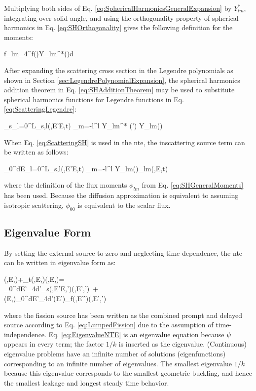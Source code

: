 Multiplying both sides of Eq. \eqref{eq:SphericalHarmonicsGeneralExpansion} by \(Y_{lm}^*\), integrating over solid angle, and using the orthogonality property of spherical harmonics in Eq. \eqref{eq:SHOrthogonality} gives the following definition for the moments:

\beq
\label{eq:SHGeneralMoments}
f_{lm}\equiv\int_{4\pi}^{}f(\hO)Y_{lm}^{*}(\hO)d\hO  
\eeq

After expanding the scattering cross section in the Legendre polynomials as shown in Section \ref{sec:LegendrePolynomialExpansion}, the spherical harmonics addition theorem in Eq. \eqref{eq:SHAdditionTheorem} may be used to substitute spherical harmonics functions for Legendre functions in Eq. \eqref{eq:ScatteringLegendre}:

\beq
\label{eq:ScatteringSH}
\Sigma_s\seatout \equiv\sum_{l=0}^L\Sigma_{s,l}(,E'\rightarrow E,t) \sum_{m=-l}^{l} Y_{lm}^{*} (\hO  ') Y_{lm}(\hO  )
\eeq

When Eq. \eqref{eq:ScatteringSH} is used in the \gls{nte}, the inscattering source term can be written as follows:

\beq
\label{eq:SHInscattering}
\int_0^\infty dE\sum_{l=0}^L\Sigma_{s,l}(,E'\rightarrow E,t) \sum_{m=-l}^{l}  Y_{lm}(\hO  )\phi_{lm}(,E,t)
\eeq

 where the definition of the flux moments \(\phi_{lm}\) from Eq. \eqref{eq:SHGeneralMoments} has been used. Because the diffusion approximation is equivalent to assuming isotropic scattering, \(\phi_{00}\) is equivalent to the scalar flux.
 
\subsection{Eigenvalue Form}
\label{sec:EigenvalueForm}
By setting the external source to zero and neglecting time dependence, the \gls{nte} can be written in eigenvalue form as:

\beqa
\label{eq:EigenvalueNTE}
\hO\cdot\nabla\psi(,E,\hO)+\Sigma_t(,E,\hO)\psi(,E,\hO)=\hspace{2cm}\\
\int_0^\infty dE'\int_{4\pi}d\hO'\Sigma_s(,E'\rightarrow E,\hO'\rightarrow\hO)\psi(,E',\hO')\ +\hspace{1cm}\\
\chi(E,\hO)\int_0^\infty dE'\int_{4\pi}d\hO'\nu(E')\Sigma_f(,E'\hO')\psi(,E',\hO')
\eeqa

where the fission source has been written as the combined prompt and delayed source according to Eq. \eqref{eq:LumpedFission} due to the assumption of time-independence. Eq. \eqref{eq:EigenvalueNTE} is an eigenvalue equation because \(\psi\) appears in every term; the factor \(1/k\) is inserted as the eigenvalue. (Continuous) eigenvalue problems have an infinite number of solutions (eigenfunctions) corresponding to an infinite number of eigenvalues. The smallest eigenvalue \(1/k\) because this eigenvalue corresponds to the smallest geometric buckling, and hence the smallest leakage and longest steady time behavior. 

